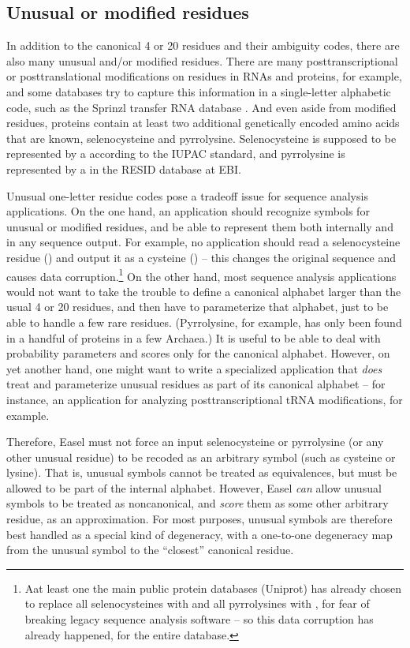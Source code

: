 \subsection{Unusual or modified residues}

In addition to the canonical 4 or 20 residues and their ambiguity
codes, there are also many unusual and/or modified residues.  There
are many posttranscriptional or posttranslational modifications on
residues in RNAs and proteins, for example, and some databases try to
capture this information in a single-letter alphabetic code, such as
the Sprinzl transfer RNA database \cite{Sprinzl98}. And even aside
from modified residues, proteins contain at least two additional
genetically encoded amino acids that are known, selenocysteine and
pyrrolysine. Selenocysteine is supposed to be represented by a
 according to the IUPAC standard, and pyrrolysine is
represented by a  in the RESID database at EBI.

Unusual one-letter residue codes pose a tradeoff issue for sequence
analysis applications. On the one hand, an application should
recognize symbols for unusual or modified residues, and be able to
represent them both internally and in any sequence output. For
example, no application should read a selenocysteine residue
() and output it as a cysteine () -- this changes
the original sequence and causes data corruption.\footnote{Aat least
one the main public protein databases (Uniprot) has already chosen to
replace all selenocysteines with  and all pyrrolysines with
, for fear of breaking legacy sequence analysis software --
so this data corruption has already happened, for the entire
database.}  On the other hand, most sequence analysis applications
would not want to take the trouble to define a canonical alphabet
larger than the usual 4 or 20 residues, and then have to parameterize
that alphabet, just to be able to handle a few rare
residues. (Pyrrolysine, for example, has only been found in a handful
of proteins in a few Archaea.) It is useful to be able to deal with
probability parameters and scores only for the canonical
alphabet. However, on yet another hand, one might want to write a
specialized application that \emph{does} treat and parameterize
unusual residues as part of its canonical alphabet -- for instance, an
application for analyzing posttranscriptional tRNA modifications, for
example.

Therefore, Easel must not force an input selenocysteine or pyrrolysine
(or any other unusual residue) to be recoded as an arbitrary symbol
(such as cysteine or lysine). That is, unusual symbols cannot be
treated as equivalences, but must be allowed to be part of the
internal alphabet.  However, Easel \emph{can} allow unusual symbols to
be treated as noncanonical, and \emph{score} them as some other
arbitrary residue, as an approximation. For most purposes, unusual
symbols are therefore best handled as a special kind of degeneracy,
with a one-to-one degeneracy map from the unusual symbol to the
``closest'' canonical residue.

